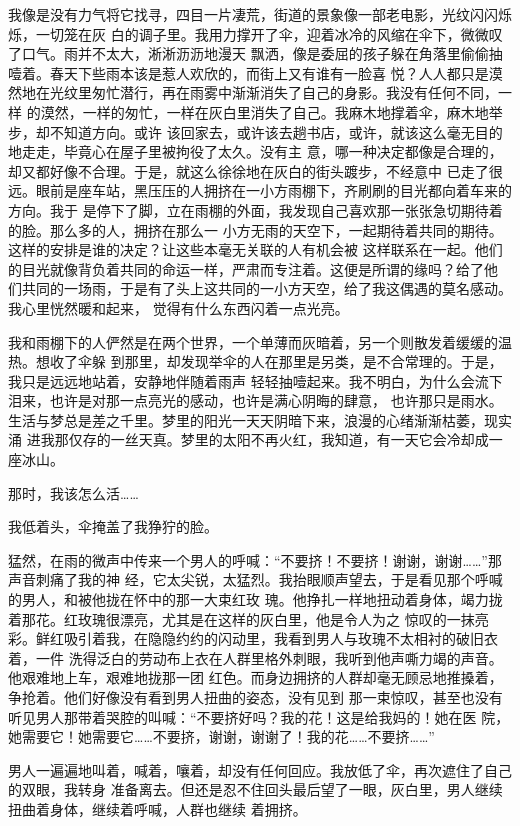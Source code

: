 		我像是没有力气将它找寻，四目一片凄荒，街道的景象像一部老电影，光纹闪闪烁烁，一切笼在灰
	白的调子里。我用力撑开了伞，迎着冰冷的风缩在伞下，微微叹了口气。雨并不太大，淅淅沥沥地漫天
	飘洒，像是委屈的孩子躲在角落里偷偷抽噎着。春天下些雨本该是惹人欢欣的，而街上又有谁有一脸喜
	悦？人人都只是漠然地在光纹里匆忙潜行，再在雨雾中渐渐消失了自己的身影。我没有任何不同，一样
	的漠然，一样的匆忙，一样在灰白里消失了自己。我麻木地撑着伞，麻木地举步，却不知道方向。或许
	该回家去，或许该去趟书店，或许，就该这么毫无目的地走走，毕竟心在屋子里被拘役了太久。没有主
	意，哪一种决定都像是合理的，却又都好像不合理。于是，就这么徐徐地在灰白的街头踱步，不经意中
	已走了很远。眼前是座车站，黑压压的人拥挤在一小方雨棚下，齐刷刷的目光都向着车来的方向。我于
	是停下了脚，立在雨棚的外面，我发现自己喜欢那一张张急切期待着的脸。那么多的人，拥挤在那么一
	小方无雨的天空下，一起期待着共同的期待。这样的安排是谁的决定？让这些本毫无关联的人有机会被
	这样联系在一起。他们的目光就像背负着共同的命运一样，严肃而专注着。这便是所谓的缘吗？给了他
	们共同的一场雨，于是有了头上这共同的一小方天空，给了我这偶遇的莫名感动。我心里恍然暖和起来，
	觉得有什么东西闪着一点光亮。

		我和雨棚下的人俨然是在两个世界，一个单薄而灰暗着，另一个则散发着缓缓的温热。想收了伞躲
	到那里，却发现举伞的人在那里是另类，是不合常理的。于是，我只是远远地站着，安静地伴随着雨声
	轻轻抽噎起来。我不明白，为什么会流下泪来，也许是对那一点亮光的感动，也许是满心阴晦的肆意，
	也许那只是雨水。生活与梦总是差之千里。梦里的阳光一天天阴暗下来，浪漫的心绪渐渐枯萎，现实涌
	进我那仅存的一丝天真。梦里的太阳不再火红，我知道，有一天它会冷却成一座冰山。

		那时，我该怎么活……

		我低着头，伞掩盖了我狰狞的脸。

		猛然，在雨的微声中传来一个男人的呼喊：“不要挤！不要挤！谢谢，谢谢……”那声音刺痛了我的神
	经，它太尖锐，太猛烈。我抬眼顺声望去，于是看见那个呼喊的男人，和被他拢在怀中的那一大束红玫
	瑰。他挣扎一样地扭动着身体，竭力拢着那花。红玫瑰很漂亮，尤其是在这样的灰白里，他是令人为之
	惊叹的一抹亮彩。鲜红吸引着我，在隐隐约约的闪动里，我看到男人与玫瑰不太相衬的破旧衣着，一件
	洗得泛白的劳动布上衣在人群里格外刺眼，我听到他声嘶力竭的声音。他艰难地上车，艰难地拢那一团
	红色。而身边拥挤的人群却毫无顾忌地推搡着，争抢着。他们好像没有看到男人扭曲的姿态，没有见到
	那一束惊叹，甚至也没有听见男人那带着哭腔的叫喊：“不要挤好吗？我的花！这是给我妈的！她在医
	院，她需要它！她需要它……不要挤，谢谢，谢谢了！我的花……不要挤……”

		男人一遍遍地叫着，喊着，嚷着，却没有任何回应。我放低了伞，再次遮住了自己的双眼，我转身
	准备离去。但还是忍不住回头最后望了一眼，灰白里，男人继续扭曲着身体，继续着呼喊，人群也继续
	着拥挤。

